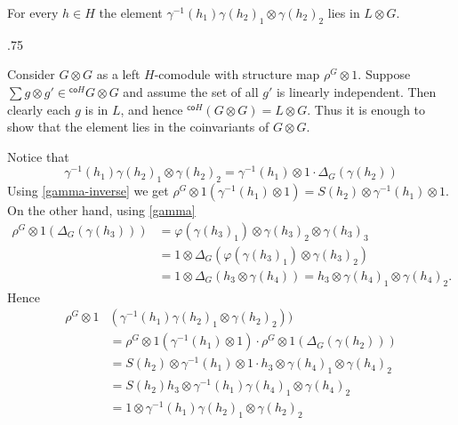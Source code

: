 \documentclass[11pt,fleqn]{article}
\makeatletter
\renewenvironment{proof}[1][\proofname]{\par
  \pushQED{\qed}%
  \normalfont \topsep.75\paraskip\relax
  \trivlist
  \item[\hskip\labelsep
        \itshape
    #1\@addpunct{.}]\ignorespaces
}{%
  \popQED\endtrivlist\@endpefalse
}
\newcommand\ot{\otimes}
\renewcommand\phi{\varphi}
\newcommand\co{\mathsf{co}}
\makeatother
\begin{document}
\begin{Lemma}
	For every $h \in H$ the element $\gamma^{-1}(h_1) \gamma(h_2)_1\ot \gamma(h_2)_2$ lies
	in $L \ot G$.
\end{Lemma}
\begin{proof}
	Consider $G \ot G$ as a left $H$-comodule with structure map $\rho^G \ot 1$. Suppose
	$\sum g \ot g' \in {}^{\co H} G \ot G$ and assume the set of all $g'$ is linearly
	independent. Then clearly each $g$ is in $L$, and hence ${}^{\co H}(G \ot G) = L \ot
	G$. Thus it is enough to show that the element lies in the coinvariants of $G \ot G$.

	Notice that
	\[
		\gamma^{-1}(h_1) \gamma(h_2)_1 \ot \gamma(h_2)_2 = \gamma^{-1}(h_1)\ot 1 \cdot
		\Delta_G(\gamma(h_2))
	\]
	Using	\ref{gamma-inverse} we get $\rho^G \ot 1 (\gamma^{-1}(h_1) \ot 1) = S(h_2) \ot
	\gamma^{-1}(h_1) \ot 1$. On the other hand, using \ref{gamma}
	\begin{align*}
		\rho^G\ot 1(\Delta_G(\gamma(h_3))) 
		&= \phi(\gamma(h_3)_1) \ot \gamma(h_3)_2 \ot \gamma(h_3)_3 \\
		&= 1 \ot \Delta_G(\phi(\gamma(h_3)_1) \ot \gamma(h_3)_2)\\
		&= 1 \ot \Delta_G(h_3 \ot \gamma(h_4)) = h_3 \ot \gamma(h_4)_1 \ot \gamma(h_4)_2.
	\end{align*}
	Hence
	\begin{align*}
		\rho^G \ot 1 &(\gamma^{-1}(h_1) \gamma(h_2)_1 \ot \gamma(h_2)_2)) \\
		&= \rho^G \ot 1(\gamma^{-1}(h_1) \ot 1) \cdot \rho^G \ot 1(\Delta_G(\gamma(h_2))) \\
		&= S(h_2) \ot \gamma^{-1}(h_1) \ot 1 \cdot h_3 \ot \gamma(h_4)_1 \ot
		\gamma(h_4)_2 \\
		&= S(h_2)h_3 \ot \gamma^{-1}(h_1)\gamma(h_4)_1 \ot \gamma(h_4)_2 \\
		&= 1 \ot \gamma^{-1}(h_1) \gamma(h_2)_1  \ot \gamma(h_2)_2
	\end{align*}
\end{proof}
\end{document}
